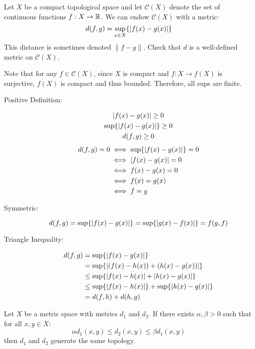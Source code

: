 \documentclass[letterpaper,12pt,fleqn]{article}
\newcommand{\norm}[1]{\left\lVert{#1}\right\rVert}
\renewcommand{\C}{\mathcal{C}}
\renewcommand{\a}{\alpha}
\renewcommand{\b}{\beta}
\begin{document}
\begin{example}[Exercise 9.2]
  Let \(X\) be a compact topological space and let \(\C(X)\) denote the set of continuous functions \(f:X\to\mathbb{R}\).  We
  can endow \(\C(X)\) with a metric:
  \[d(f,g)=\sup_{x\in X}\{\lvert f(x)-g(x)\rvert\}\]
  This distance is sometimes denoted \(\norm{f-g}\).  Check that \(d\) is a well-defined metric on \(\C(X)\).

  Note that for any \(f\in\C(X)\), since \(X\) is compact and \(f:X\to f(X)\) is surjective, \(f(X)\) is compact
  and thus bounded.  Therefore, all sups are finite.

  \begin{description}
  \item[Positive Definition:]
    \begin{gather*}
      \lvert f(x)-g(x)\rvert\ge0 \\
      \sup\{\lvert f(x)-g(x)\rvert\}\ge0 \\
      d(f,g)\ge0
    \end{gather*}
    \begin{align*}
      d(f,g)=0 &\iff \sup\{\lvert f(x)-g(x)\rvert\}=0 \\
      &\iff \lvert f(x)-g(x)\rvert=0 \\
      &\iff f(x)-g(x)=0 \\
      &\iff f(x)=g(x) \\
      &\iff f=g
    \end{align*}
  \item[Symmetric:]
    \[d(f,g)=\sup\{\lvert f(x)-g(x)\rvert\}=\sup\{\lvert g(x)-f(x)\rvert\}=f(g,f)\]
  \item[Triangle Inequality:]
    \begin{align*}
      d(f,g) &= \sup\{\lvert f(x)-g(x)\rvert\} \\
      &= \sup\{\lvert(f(x)-h(x))+(h(x)-g(x))\rvert\} \\
      &\le \sup\{\lvert f(x)-h(x)\rvert+\lvert h(x)-g(x)\rvert\} \\
      &\le \sup\{\lvert f(x)-h(x)\rvert\}+\sup\{\lvert h(x)-g(x)\rvert\} \\
      &= d(f,h)+d(h,g)
    \end{align*}
  \end{description}
\end{example}

\begin{lemma}
  Let \(X\) be a metric space with metrics \(d_1\) and \(d_2\).  If there exists \(\a,\b>0\) such that for all
  \(x,y\in X\):
  \[\a d_1(x,y)\le d_2(x,y)\le\b d_1(x,y)\]
  then \(d_1\) and \(d_2\) generate the same topology.
\end{lemma}
\end{document}
